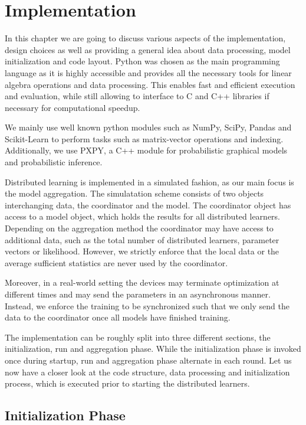 
\chapter{Implementation}
\label{chapter:ch4}
In this chapter we are going to  discuss various aspects of the implementation, design choices as well as providing a general idea about data processing, model initialization and code layout.
Python was chosen as the main programming language as it is highly accessible and provides all the necessary tools for linear algebra operations and data processing.
This enables fast and efficient execution and evaluation, while still allowing to interface to C and C++  libraries if necessary for computational speedup.

We mainly use well known python modules such as NumPy, SciPy, Pandas and Scikit-Learn to perform tasks such as matrix-vector operations and indexing.
Additionally, we use PXPY, a C++ module for probabilistic graphical models and probabilistic inference.

Distributed learning is implemented in a simulated fashion, as our main focus is the model aggregation.
The simulatation scheme consists of two objects interchanging data, the coordinator and the model. 
The coordinator object has access to a model object, which holds the results for all distributed learners.
Depending on the aggregation method the coordinator may have access to additional data, such as the total number of distributed learners, parameter vectors or likelihood. 
However, we strictly enforce that the local data or the average sufficient statistics are never used by the coordinator.

Moreover, in a real-world setting the devices may terminate optimization at different times and may send the parameters in an asynchronous manner. 
Instead, we enforce the training to be synchronized such that we only send the data to the coordinator once all models have finished training.

The implementation can be roughly split into three different sections, the initialization, run and aggregation phase.
While the initialization phase is invoked once during startup, run and aggregation phase alternate in each round.
Let us now have a closer look at the code structure, data processing and initialization process, which is executed prior to starting the distributed learners. 

\section{Initialization Phase}


